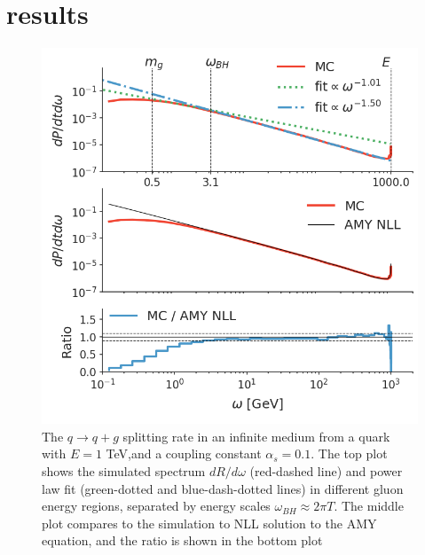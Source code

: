 \documentclass[aps, prc, reprint, amsmath, groupedaddress, nofootinbib]{revtex4-1}
\begin{document}
\section{results}\label{section:results}
\begin{figure}
\includegraphics[width=\columnwidth]{spectrum.png}
\caption{The $q\rightarrow q+g$ splitting rate in an infinite medium from a quark with $E=1$ TeV,and a coupling constant $\alpha_s = 0.1$. The top plot shows the simulated spectrum $dR/d\omega$ (red-dashed line) and power law fit (green-dotted and blue-dash-dotted lines) in different gluon energy regions, separated by energy scales $\omega_{BH}\approx 2\pi T$. The middle plot compares to the simulation to NLL solution to the AMY equation, and the ratio is shown in the bottom plot}
\label{fig:spectrum}
\end{figure}
\end{document}
